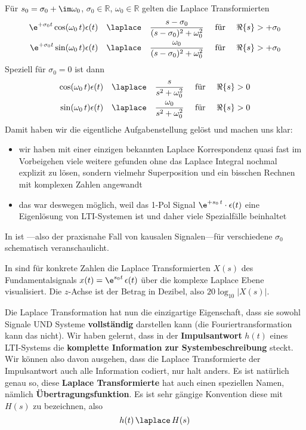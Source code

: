 \begin{Loesung}
Für $s_0=\sigma_0 + \im \omega_0$,
$\sigma_0\in\mathbb{R}$,
$\omega_0\in\mathbb{R}$
gelten die Laplace Transformierten
\begin{align}
\label{eq:31AEFEF90B}
\e^{+\sigma_0 t} \cos(\omega_0 \, t) \epsilon(t)
\quad \laplace \quad
\frac{s-\sigma_0}{(s-\sigma_0)^2+\omega_0^2}
\quad\text{ für } \quad\Re\{s\} >  +\sigma_0
\\
\e^{+\sigma_0 t} \sin(\omega_0 \, t) \epsilon(t)
\quad \laplace \quad
\frac{\omega_0}{(s-\sigma_0)^2+\omega_0^2}
\quad\text{ für } \quad\Re\{s\} >  +\sigma_0
\end{align}
Speziell für $\sigma_0=0$ ist dann
\begin{align}
\cos(\omega_0 \, t) \epsilon(t)
\quad \laplace \quad
\frac{s}{s^2+\omega_0^2}
\quad\text{ für } \quad\Re\{s\} > 0
\\
\sin(\omega_0 \, t) \epsilon(t)
\quad \laplace \quad
\frac{\omega_0}{s^2+\omega_0^2}
\quad\text{ für } \quad\Re\{s\} > 0
\end{align}
%
Damit haben wir die eigentliche Aufgabenstellung gelöst und machen uns klar:
\begin{itemize}
\item wir haben mit einer einzigen bekannten Laplace Korrespondenz
quasi fast im Vorbeigehen viele weitere gefunden
ohne das Laplace Integral nochmal explizit zu lösen, sondern vielmehr Superposition
und ein bisschen Rechnen mit komplexen Zahlen angewandt
\item das war deswegen möglich, weil das 1-Pol Signal
$\e^{+s_0 \, t} \cdot \epsilon(t)$ eine Eigenlösung von LTI-Systemen ist und
daher viele Spezialfälle beinhaltet
\end{itemize}

In  ist ---also der praxisnahe Fall von
kausalen Signalen---für verschiedene $\sigma_0$ schematisch veranschaulicht.

In  sind für konkrete Zahlen die Laplace
Transformierten $X(s)$ des Fundamentalsignals $x(t)=\e^{s_0 t}\,\epsilon(t)$
über die komplexe Laplace Ebene visualisiert.
Die $z$-Achse ist der Betrag in Dezibel, also
$20 \log_{10}|X(s)|$.

\textbf{}
Die Laplace Transformation hat nun die einzigartige Eigenschaft, dass sie
sowohl Signale UND Systeme \textbf{vollständig} darstellen kann
(die Fouriertransformation kann das nicht).
%
Wir haben gelernt, dass in der \textbf{Impulsantwort} $h(t)$ eines LTI-Systems die
\textbf{komplette Information zur Systembeschreibung} steckt.
%
Wir können also davon ausgehen, dass die Laplace Transformierte der Impulsantwort
auch alle Information codiert, nur halt anders. Es ist natürlich genau so, diese
\textbf{Laplace Transformierte} hat auch einen speziellen Namen, nämlich
\textbf{Übertragungsfunktion}.
Es ist sehr gängige Konvention diese mit $H(s)$ zu bezeichnen, also
\begin{equation}
h(t) \, \laplace \, H(s)
\end{equation}
%


\end{Loesung}
